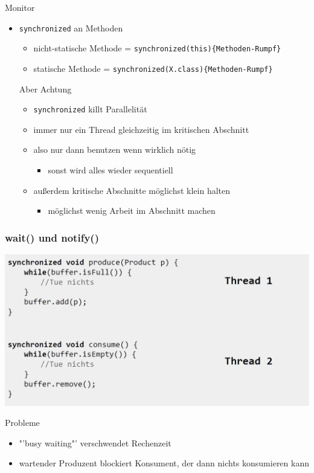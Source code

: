 \documentclass[18pt]{beamer}
\begin{document}
	\begin{frame}{Monitor}
		\begin{itemize}
			\item \texttt{synchronized} an Methoden 
			\begin{itemize}
				\item nicht-statische Methode = \texttt{synchronized(this)\{Methoden-Rumpf\}} 
				\item statische Methode = \texttt{synchronized(X.class)\{Methoden-Rumpf\}} 
			\end{itemize}
			\pause 
			\begin{alertblock}{Aber Achtung}
				\begin{itemize}
					\item \texttt{synchronized} killt Parallelität
					\item immer nur ein Thread gleichzeitig im kritischen Abschnitt
					\item also nur dann benutzen wenn wirklich nötig 
					\begin{itemize}
						\item sonst wird alles wieder sequentiell
					\end{itemize} 
					\item außerdem kritische Abschnitte möglichst klein halten
					\begin{itemize}
						\item möglichst wenig Arbeit im Abschnitt machen
					\end{itemize}
				\end{itemize}
			\end{alertblock}

		\end{itemize}
	\end{frame}

	\begin{frame}
		\frametitle{wait() und notify()}
		\includegraphics[scale=0.3]{./pics/tut5/cons-prod.png}
		\pause
		\begin{alertblock}{Probleme}
			\begin{itemize}
				\pause
				\item "'busy waiting"' verschwendet Rechenzeit \pause
				\item wartender Produzent blockiert Konsument, der dann nichts konsumieren kann 
			\end{itemize}
		\end{alertblock}
	\end{frame}
\end{document}

